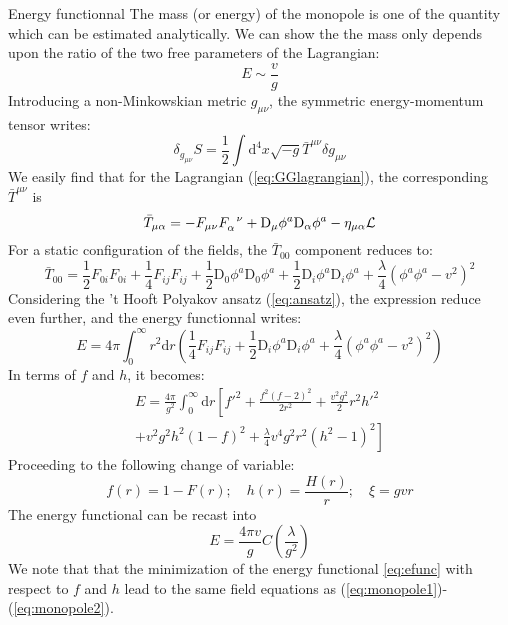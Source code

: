 \begin{subsection}{Energy functionnal}
  The mass (or energy) of the monopole is one of the quantity which
  can be estimated analytically. We can show the the mass only depends
  upon the ratio of the two free parameters of the Lagrangian:
  \begin{equation}
    E \sim \frac{v}{g}
  \end{equation}
  Introducing a non-Minkowskian metric $g_{\mu\nu}$, the symmetric
  energy-momentum tensor writes:
  \begin{equation}
    \delta_{g_{\mu\nu}}S = \frac{1}{2}\int\mathrm{d}^4x\sqrt{-g}\bar T^{\mu\nu}\delta g_{\mu\nu}
  \end{equation}
  We easily find that for the Lagrangian (\ref{eq:GGlagrangian}), the
  corresponding $\bar T^{\mu\nu}$ is
  \begin{equation}
    \bar T_{\mu\alpha} = -F_{\mu\nu}F_{\alpha}^{\hphantom{\alpha}\nu}+\mathrm{D}_\mu \phi^a \mathrm{D}_\alpha\phi^a-\eta_{\mu\alpha}\mathcal L
  \end{equation}
  For a static configuration of the fields, the $\bar T_{00}$
  component reduces to:
  \begin{equation}
    \bar T_{00} = \frac{1}{2}F_{0i}F_{0i}+\frac{1}{4}F_{ij}F_{ij} +\frac{1}{2}\mathrm{D}_0\phi^a\mathrm{D}_0\phi^a+\frac{1}{2}\mathrm{D}_i\phi^a\mathrm{D}_i\phi^a+\frac{\lambda}{4}\left(\phi^a\phi^a-v^2\right)^2
  \end{equation}
  Considering the 't Hooft Polyakov ansatz (\ref{eq:ansatz}), the
  expression reduce even further, and the energy functionnal writes:
  \begin{equation}
    E = 4\pi\int_0^\infty r^2\mathrm dr\left(\frac{1}{4}F_{ij}F_{ij}+\frac{1}{2}\mathrm{D}_i\phi^a\mathrm{D}_i\phi^a+\frac{\lambda}{4}\left(\phi^a\phi^a-v^2\right)^2\right)\label{eq:staticefunc}
  \end{equation}
  In terms of $f$ and $h$, it becomes:
  \begin{multline}
    E = \frac{4\pi}{g^2}\int_0^\infty \mathrm{d}r \left[f'^2+\frac{f^2(f-2)^2}{2r^2}+\frac{v^2g^2}{2}r^2h'^2\right.\\
      \left.+ v^2g^2h^2(1-f)^2+\frac{\lambda}{4}v^4g^2r^2(h^2-1)^2\right]\label{eq:efunc}
  \end{multline}
  Proceeding to the following change of variable:
  \begin{equation}
    f(r)=1-F(r);\quad h(r)=\frac{H(r)}{r} ;\quad \xi = gvr
  \end{equation}
  The energy functional can be recast into
  \begin{equation}
    E = \frac{4\pi v}{g} C\left(\frac{\lambda}{g^2}\right)
  \end{equation}
  We note that that the minimization of the energy functional
  \ref{eq:efunc} with respect to $f$ and $h$ lead to the same field
  equations as (\ref{eq:monopole1})-(\ref{eq:monopole2}).



\end{subsection}
